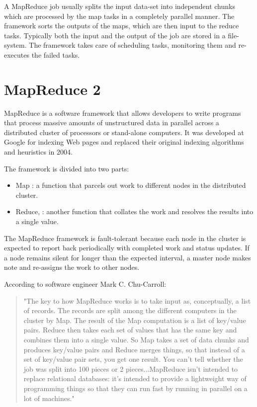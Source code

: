 \documentclass[11pt]{article} %
\begin{document}
A MapReduce job usually splits the input data-set into independent chunks which are processed by the map tasks in a completely parallel manner. The framework sorts the outputs of the maps, which are then input to the reduce tasks. Typically both the input and the output of the job are stored in a file-system. The framework takes care of scheduling tasks, monitoring them and re-executes the failed tasks.

\section{MapReduce 2}


MapReduce is a software framework that allows developers to write programs that process massive amounts of unstructured data in parallel across a distributed cluster of processors or stand-alone computers. It was developed at Google for indexing Web pages and replaced their original indexing algorithms and heuristics in 2004.


The framework is divided into two parts:
\begin{itemize}
\item Map : a function that parcels out work to different nodes in the distributed cluster.
\item Reduce, : another function that collates the work and resolves the results into a single value.
\end{itemize}


The MapReduce framework is fault-tolerant because each node in the cluster is expected to report back periodically with completed work and status updates. If a node remains silent for longer than the expected interval, a master node makes note and re-assigns the work to other nodes.


According to software engineer Mark C. Chu-Carroll:

\begin{quote}
"The key to how MapReduce works is to take input as, conceptually, a list of records. The records are split among the different computers in the cluster by Map. The result of the Map computation is a list of key/value pairs. Reduce then takes each set of values that has the same key and combines them into a single value. So Map takes a set of data chunks and produces key/value pairs and Reduce merges things, so that instead of a set of key/value pair sets, you get one result. You can't tell whether the job was split into 100 pieces or 2 pieces...MapReduce isn't intended to replace relational databases: it's intended to provide a lightweight way of programming things so that they can run fast by running in parallel on a lot of machines."
\end{quote}
\end{document}
